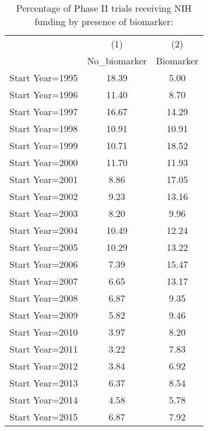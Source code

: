 \begin{table}[htbp]\centering
\caption{Percentage of Phase II trials receiving NIH funding by presence of biomarker: }
\begin{tabular}{l*{2}{c}}
\hline\hline
                    &\multicolumn{1}{c}{(1)}&\multicolumn{1}{c}{(2)}\\
                    &\multicolumn{1}{c}{No\_biomarker}&\multicolumn{1}{c}{Biomarker}\\
\hline
Start Year=1995     &       18.39&        5.00\\
Start Year=1996     &       11.40&        8.70\\
Start Year=1997     &       16.67&       14.29\\
Start Year=1998     &       10.91&       10.91\\
Start Year=1999     &       10.71&       18.52\\
Start Year=2000     &       11.70&       11.93\\
Start Year=2001     &        8.86&       17.05\\
Start Year=2002     &        9.23&       13.16\\
Start Year=2003     &        8.20&        9.96\\
Start Year=2004     &       10.49&       12.24\\
Start Year=2005     &       10.29&       13.22\\
Start Year=2006     &        7.39&       15.47\\
Start Year=2007     &        6.65&       13.17\\
Start Year=2008     &        6.87&        9.35\\
Start Year=2009     &        5.82&        9.46\\
Start Year=2010     &        3.97&        8.20\\
Start Year=2011     &        3.22&        7.83\\
Start Year=2012     &        3.84&        6.92\\
Start Year=2013     &        6.37&        8.54\\
Start Year=2014     &        4.58&        5.78\\
Start Year=2015     &        6.87&        7.92\\
\hline\hline
\end{tabular}
\end{table}
